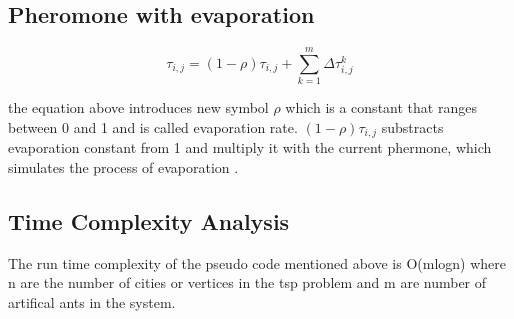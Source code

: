 \documentclass{article}
\begin{document}
\subsection*{Pheromone with evaporation}
\begin{equation}
	\tau_{i, j} = (1-\rho) \tau_{i,j} + \sum_{k=1}^m \Delta{\tau_{i, j} ^k}
\end{equation} 

the equation above introduces new symbol ${\rho}$ which is a constant that ranges between 0 and 1 and is called evaporation rate. ${(1-\rho) \tau_{i,j}}$ substracts evaporation constant from 1 and multiply it with the current phermone, which simulates the process of evaporation \citep*{4129846}.

\subsection*{Time Complexity Analysis}

The run time complexity of the pseudo code mentioned above is O(mlogn) where n are the number of cities or vertices in the tsp problem and m are number of artifical ants in the system.  
\citep*{GUTJAHR20082711}


 
\end{document}
